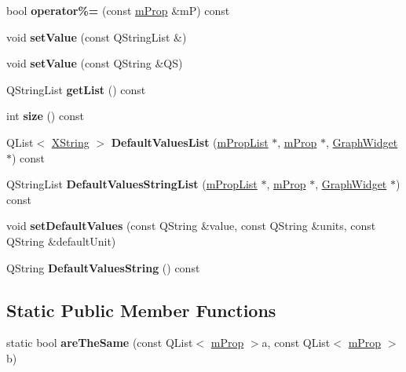 \begin{DoxyCompactItemize}
\item 
\mbox{\label{classm_prop_acd428ef5ce94ce948d8178321b3b8a12}} 
bool {\bfseries operator\%=} (const \hyperlink{classm_prop}{m\+Prop} \&mP) const
\item 
\mbox{\label{classm_prop_a817ee4f010fbcf923d2df3a325908ce3}} 
void {\bfseries set\+Value} (const Q\+String\+List \&)
\item 
\mbox{\label{classm_prop_a360b99ff7bfe8341b4d6504d1001a06a}} 
void {\bfseries set\+Value} (const Q\+String \&QS)
\item 
\mbox{\label{classm_prop_a18e424668085188d5d4c38756fac866c}} 
Q\+String\+List {\bfseries get\+List} () const
\item 
\mbox{\label{classm_prop_a82f554cd4fa533039bc9e11386ff8010}} 
int {\bfseries size} () const
\item 
\mbox{\label{classm_prop_a586a97dd088e573c4f18a2976e7dd9a2}} 
Q\+List$<$ \hyperlink{class_x_string}{X\+String} $>$ {\bfseries Default\+Values\+List} (\hyperlink{classm_prop_list}{m\+Prop\+List} $\ast$, \hyperlink{classm_prop}{m\+Prop} $\ast$, \hyperlink{class_graph_widget}{Graph\+Widget} $\ast$) const
\item 
\mbox{\label{classm_prop_a1c0f2d4da485e6791942132b0deba847}} 
Q\+String\+List {\bfseries Default\+Values\+String\+List} (\hyperlink{classm_prop_list}{m\+Prop\+List} $\ast$, \hyperlink{classm_prop}{m\+Prop} $\ast$, \hyperlink{class_graph_widget}{Graph\+Widget} $\ast$) const
\item 
\mbox{\label{classm_prop_aeef0487c210153cf08741b49e176ede8}} 
void {\bfseries set\+Default\+Values} (const Q\+String \&value, const Q\+String \&units, const Q\+String \&default\+Unit)
\item 
\mbox{\label{classm_prop_a4005d341103d639d6a3eda319007cdcd}} 
Q\+String {\bfseries Default\+Values\+String} () const
\end{DoxyCompactItemize}
\subsection*{Static Public Member Functions}
\begin{DoxyCompactItemize}
\item 
\mbox{\label{classm_prop_a80f725be2f80dff1de55863f31d4c108}} 
static bool {\bfseries are\+The\+Same} (const Q\+List$<$ \hyperlink{classm_prop}{m\+Prop} $>$a, const Q\+List$<$ \hyperlink{classm_prop}{m\+Prop} $>$b)
\end{DoxyCompactItemize}

